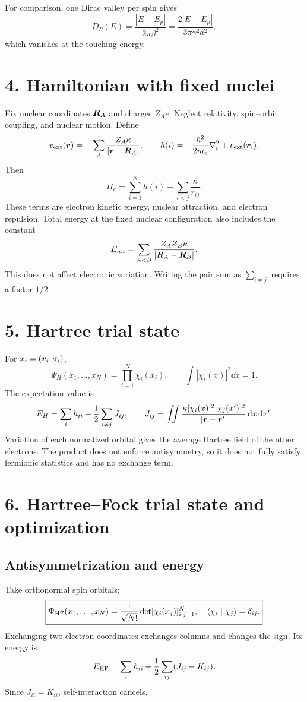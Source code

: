 For comparison, one Dirac valley per spin gives
\[
D_P(E)=\frac{|E-E_p|}{2\pi\beta^2}=\frac{2|E-E_p|}{3\pi\gamma^2a^2},
\]
which vanishes at the touching energy.

\section*{4. Hamiltonian with fixed nuclei}
Fix nuclear coordinates $\boldsymbol{R}_A$ and charges $Z_Ae$. Neglect relativity, spin--orbit coupling, and nuclear motion. Define
\[
v_{\rm ext}(\boldsymbol{r})=-\sum_A\frac{Z_A\kappa}{|\boldsymbol{r}-\boldsymbol{R}_A|},\qquad
h(i)=-\frac{\hbar^2}{2m_e}\nabla_i^2+v_{\rm ext}(\boldsymbol{r}_i).
\]
Then
\[
\boxed{H_e=\sum_{i=1}^Nh(i)+\sum_{i<j}\frac{\kappa}{r_{ij}}.}
\]
These terms are electron kinetic energy, nuclear attraction, and electron repulsion. Total energy at the fixed nuclear configuration also includes the constant
\[
E_{nn}=\sum_{A<B}\frac{Z_AZ_B\kappa}{|\boldsymbol{R}_A-\boldsymbol{R}_B|}.
\]
This does not affect electronic variation. Writing the pair sum as $\sum_{i\ne j}$ requires a factor $1/2$.

\section*{5. Hartree trial state}
For $x_i=(\boldsymbol{r}_i,\sigma_i)$,
\[
\boxed{\Psi_H(x_1,\ldots,x_N)=\prod_{i=1}^N\chi_i(x_i),\qquad
\int|\chi_i(x)|^2\dd x=1.}
\]
The expectation value is
\[
E_H=\sum_i h_{ii}+\frac12\sum_{i\ne j}J_{ij},\qquad
J_{ij}=\iint\frac{\kappa|\chi_i(x)|^2|\chi_j(x')|^2}{|\boldsymbol{r}-\boldsymbol{r}'|}\mathop{}\!\mathrm{d} x\mathop{}\!\mathrm{d} x'.
\]
Variation of each normalized orbital gives the average Hartree field of the other electrons. The product does not enforce antisymmetry, so it does not fully satisfy fermionic statistics and has no exchange term.

\section*{6. Hartree--Fock trial state and optimization}
\subsection*{Antisymmetrization and energy}
Take orthonormal spin orbitals:
\[
\boxed{\Psi_{\rm HF}(x_1,\ldots,x_N)=\frac1{\sqrt{N!}}\det[\chi_i(x_j)]_{i,j=1}^N,\quad
\langle\chi_i\mid\chi_j\rangle=\delta_{ij}.}
\]
Exchanging two electron coordinates exchanges columns and changes the sign. Its energy is
\[
E_{\rm HF}=\sum_i h_{ii}+\frac12\sum_{ij}(J_{ij}-K_{ij}).
\]
Since $J_{ii}=K_{ii}$, self-interaction cancels.

